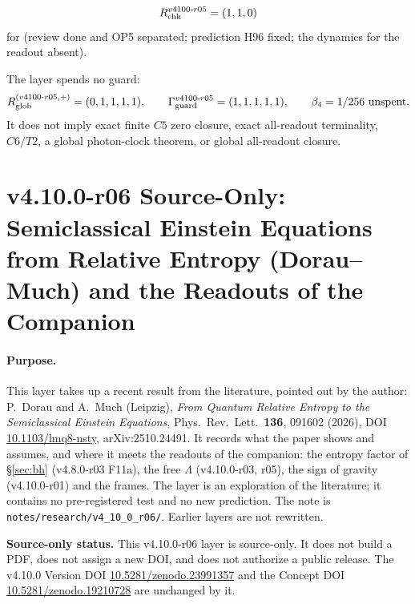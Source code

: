 \[
R_{\rm chk}^{v4100\text{-}r05}=(1,1,0)
\]
for (review done and OP5 separated; prediction H96 fixed; the dynamics for the readout absent).

The layer spends no guard:
\[
R_{\rm glob}^{(v4100\text{-}r05,+)}=(0,1,1,1,1),
\qquad
\Gamma_{\rm guard}^{v4100\text{-}r05}=(1,1,1,1,1),
\qquad
\beta_4=1/256\ \text{unspent}.
\]
It does not imply exact finite \(C5\) zero closure, exact all-readout terminality,
\(C6/T2\), a global photon-clock theorem, or global all-readout closure.
\clearpage
\section*{v4.10.0-r06 Source-Only: Semiclassical Einstein Equations from Relative Entropy (Dorau--Much) and the Readouts of the Companion}
\label{sec:v4100-r06-relative-entropy}

\paragraph{Purpose.}
This layer takes up a recent result from the literature, pointed out by the author: P.~Dorau and A.~Much (Leipzig), \emph{From Quantum
Relative Entropy to the Semiclassical Einstein Equations}, Phys.\ Rev.\ Lett.\ \textbf{136}, 091602 (2026), DOI
\href{https://doi.org/10.1103/lmq8-nsty}{10.1103/lmq8-nsty}, arXiv:2510.24491.  It records what the paper shows and assumes, and where it meets the
readouts of the companion: the entropy factor of \S\ref{sec:bh} (v4.8.0-r03 F11a), the free \(\Lambda\) (v4.10.0-r03, r05), the sign of gravity
(v4.10.0-r01) and the frames.  The layer is an exploration of the literature; it contains no pre-registered test and no new prediction.
The note is \texttt{notes/\allowbreak research/\allowbreak v4\_10\_0\_r06/}.  Earlier layers are not rewritten.

\noindent\textbf{Source-only status.}
This v4.10.0-r06 layer is source-only.  It does not build a PDF, does not assign a new DOI,
and does not authorize a public release.  The v4.10.0 Version DOI
\href{https://doi.org/10.5281/zenodo.23991357}{10.5281/zenodo.23991357} and the Concept DOI
\href{https://doi.org/10.5281/zenodo.19210728}{10.5281/zenodo.19210728} are unchanged by it.

